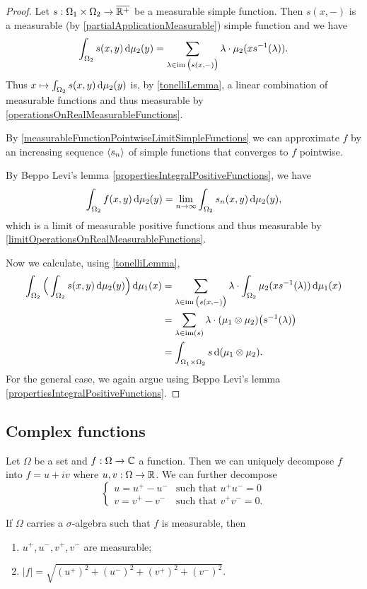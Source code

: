 \begin{proof}
Let $s: \Omega_1\times\Omega_2 \to \overline{\mathbb{R}^+}$ be a measurable simple function. Then $s(x,-)$ is a measurable (by \ref{partialApplicationMeasurable}) simple function and we have
\[ \int_{\Omega_2}s(x,y)\operatorname{d \!}{\mu_2(y)}  = \sum_{\lambda\in\operatorname{im}\big(s(x,-)\big)}\lambda\cdot\mu_2(xs^{-1}(\lambda)). \]
Thus $x\mapsto \int_{\Omega_2}s(x,y)\operatorname{d \!}{\mu_2(y)}$ is, by \ref{tonelliLemma}, a linear combination of measurable functions and thus measurable by \ref{operationsOnRealMeasurableFunctions}.

By \ref{measurableFunctionPointwiseLimitSimpleFunctions} we can approximate $f$ by an increasing sequence $\left\langle s_n \right\rangle$ of simple functions that converges to $f$ pointwise.

By Beppo Levi's lemma \ref{propertiesIntegralPositiveFunctions}, we have
\[ \int_{\Omega_2}f(x,y)\operatorname{d \!}{\mu_2(y)} = \lim_{n\to\infty}\int_{\Omega_2}s_n(x,y)\operatorname{d \!}{\mu_2(y)}, \]
which is a limit of measurable positive functions and thus measurable by \ref{limitOperationsOnRealMeasurableFunctions}.

Now we calculate, using \ref{tonelliLemma},
\begin{align*}
\int_{\Omega_2}\Big(\int_{\Omega_2}s(x,y)\operatorname{d \!}{\mu_2(y)}\Big)\operatorname{d \!}{\mu_1(x)} &= \sum_{\lambda\in\operatorname{im}\big(s(x,-)\big)}\lambda\cdot \int_{\Omega_2} \mu_2(xs^{-1}(\lambda)) \operatorname{d \!}{\mu_1(x)} \\
&= \sum_{\lambda\in\operatorname{im}(s)}\lambda\cdot (\mu_1\otimes\mu_2)\big(s^{-1}(\lambda)\big) \\
&= \int_{\Omega_1\times\Omega_2}s \operatorname{d \!}{(\mu_1\otimes
\mu_2)}.
\end{align*}
For the general case, we again argue using Beppo Levi's lemma \ref{propertiesIntegralPositiveFunctions}.
\end{proof}

\subsection{Complex functions}
Let $\Omega$ be a set and $f:\Omega \to \mathbb{C}$ a function.  Then we can uniquely decompose $f$ into $f= u+iv$ where $u,v: \Omega\to \mathbb{R}$. We can further decompose
\[ \begin{cases}
u = u^+ - u^- & \text{such that $u^+u^- = 0$} \\
v = v^+ - v^- & \text{such that $v^+v^- = 0$.}
\end{cases} \]

\begin{lemma}
If $\Omega $ carries a $\sigma$-algebra such that $f$ is measurable, then
\begin{enumerate}
\item $u^+,u^-,v^+,v^-$ are measurable;
\item $|f| = \sqrt{(u^+)^2+ (u^-)^2 + (v^+)^2 + (v^-)^2}$.
\end{enumerate}
\end{lemma}

